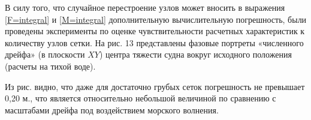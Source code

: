 В силу того, что случайное перестроение узлов может вносить в выражения \eqref{F=integral} и \eqref{M=integral} дополнительную вычислительную погрешность, были проведены эксперименты по оценке чувствительности расчетных характеристик к количеству узлов сетки. На рис. 13 представлены фазовые портреты «численного дрейфа» (в плоскости $XY$) центра тяжести судна вокруг исходного положения (расчеты на тихой воде).

Из рис. видно, что даже для достаточно грубых сеток погрешность не превышает 0,20 м., что является относительно небольшой величиной по сравнению с масштабами дрейфа под воздействием морского волнения.